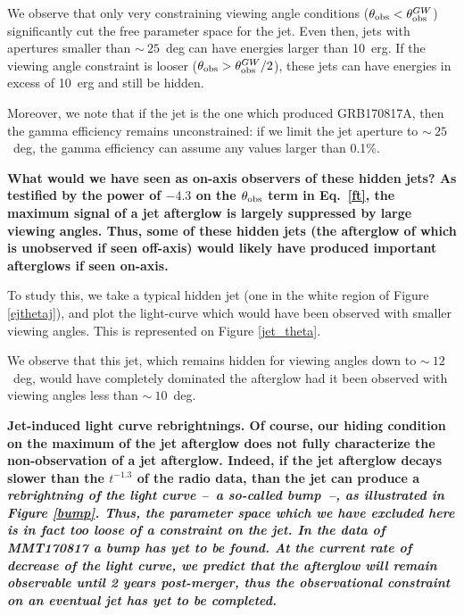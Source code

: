 
We observe that only very constraining viewing angle conditions ($\theta_{\mathrm{obs}} < \theta_{\mathrm{obs}}^{GW}$) significantly cut the free parameter space for the jet. Even then, jets with apertures smaller than $\sim~25$~deg can have energies larger than 10~erg. If the viewing angle constraint is looser ($\theta_{\mathrm{obs}} > \theta_{\mathrm{obs}}^{GW}/2$), these jets can have energies in excess of 10~erg and still be hidden.

Moreover, we note that if the jet is the one which produced GRB170817A, then the gamma efficiency remains unconstrained: if we limit the jet aperture to $\sim~25$~deg, the gamma efficiency can assume any values larger than 0.1\%.

\bf{What would we have seen as on-axis observers of these hidden jets?} As testified by the power of $-4.3$ on the $\theta_{\mathrm{obs}}$ term in Eq.~\ref{ft}, the maximum signal of a jet afterglow is largely suppressed by large viewing angles. Thus, some of these hidden jets (the afterglow of which is unobserved if seen off-axis) would likely have produced important afterglows if seen on-axis.

To study this, we take a typical hidden jet (one in the white region of Figure \ref{ejthetaj}), and plot the light-curve which would have been observed with smaller viewing angles. This is represented on Figure \ref{jet_theta}.


We observe that this jet, which remains hidden for viewing angles down to $\sim~12$~deg, would have completely dominated the afterglow had it been observed with viewing angles less than $\sim~10$~deg.


\bf{Jet-induced light curve rebrightnings.} Of course, our hiding condition on the maximum of the jet afterglow does not fully characterize the non-observation of a jet afterglow. Indeed, if the jet afterglow decays slower than the $t^{-1.3}$ of the radio data, than the jet can produce a \it{rebrightning} of the light curve --~a so-called \it{bump}~--, as illustrated in Figure \ref{bump}. Thus, the parameter space which we have excluded here is in fact too loose of a constraint on the jet. In the data of MMT170817 a bump has yet to be found. At the current rate of decrease of the light curve, we predict that the afterglow will remain observable until 2 years post-merger, thus the observational constraint on an eventual jet has yet to be completed.

